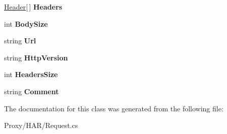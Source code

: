 \begin{DoxyCompactItemize}
\item 
\hypertarget{class_proto_test_1_1_golem_1_1_proxy_1_1_h_a_r_1_1_request_ad3d2ff10a0fe4ffd98bc598b029f66de}{\hyperlink{class_proto_test_1_1_golem_1_1_proxy_1_1_h_a_r_1_1_header}{Header}\mbox{[}$\,$\mbox{]} {\bfseries Headers}}\label{class_proto_test_1_1_golem_1_1_proxy_1_1_h_a_r_1_1_request_ad3d2ff10a0fe4ffd98bc598b029f66de}

\item 
\hypertarget{class_proto_test_1_1_golem_1_1_proxy_1_1_h_a_r_1_1_request_a7c771b28d30b081be9a6f43fbf1a1246}{int {\bfseries Body\-Size}}\label{class_proto_test_1_1_golem_1_1_proxy_1_1_h_a_r_1_1_request_a7c771b28d30b081be9a6f43fbf1a1246}

\item 
\hypertarget{class_proto_test_1_1_golem_1_1_proxy_1_1_h_a_r_1_1_request_a6cf3be4d5f61893c6aae45c7dba520d1}{string {\bfseries Url}}\label{class_proto_test_1_1_golem_1_1_proxy_1_1_h_a_r_1_1_request_a6cf3be4d5f61893c6aae45c7dba520d1}

\item 
\hypertarget{class_proto_test_1_1_golem_1_1_proxy_1_1_h_a_r_1_1_request_a52c21db06c7ee9126bfb8a3d8efead77}{string {\bfseries Http\-Version}}\label{class_proto_test_1_1_golem_1_1_proxy_1_1_h_a_r_1_1_request_a52c21db06c7ee9126bfb8a3d8efead77}

\item 
\hypertarget{class_proto_test_1_1_golem_1_1_proxy_1_1_h_a_r_1_1_request_ac2749ef0fd52de2edb6f670ea0f1ef19}{int {\bfseries Headers\-Size}}\label{class_proto_test_1_1_golem_1_1_proxy_1_1_h_a_r_1_1_request_ac2749ef0fd52de2edb6f670ea0f1ef19}

\item 
\hypertarget{class_proto_test_1_1_golem_1_1_proxy_1_1_h_a_r_1_1_request_ae4f3663af9f97d0bda3c135415bafd01}{string {\bfseries Comment}}\label{class_proto_test_1_1_golem_1_1_proxy_1_1_h_a_r_1_1_request_ae4f3663af9f97d0bda3c135415bafd01}

\end{DoxyCompactItemize}


The documentation for this class was generated from the following file\-:\begin{DoxyCompactItemize}
\item 
Proxy/\-H\-A\-R/Request.\-cs\end{DoxyCompactItemize}
